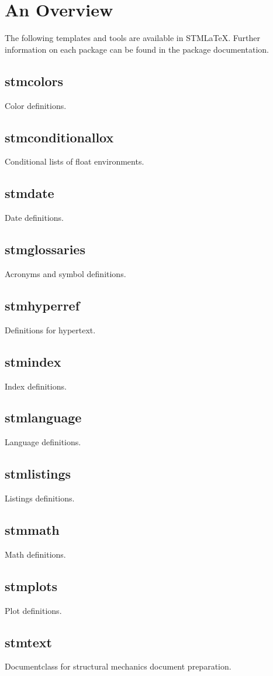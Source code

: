 \documentclass[%
  type=article,%
  layout=koma,%
  page=false,%
  hyperref=true,%
  cleveref=true,%
  conditionallox=true,%
  conditionalloxnewpage=true,%
  date=true,%
  glossaries=true,%
  index=true,%
  math=true,%
  listings=true%
]{stmtext}
\author{Martin R\"{a}del}
\title{\stmlatex}
\subtitle{%
Overview and Installation Guide\\
Copyright \copyright{} \the\year{} DLR SY STM\\v\formatdate[versiondatestyle]{\DTMToday}\\
{\bigskip\small\normalfont Thankfully inspired by the RM-\LaTeX package guide.}
}
\date{\today}
\newcommand{\package}[1]{\subsection*{#1}\par\medskip\noindent\ignorespaces}
\newcommand{\stmlatex}{STM\LaTeX\xspace}
\begin{document}
\maketitle


\begin{abstract}
\stmlatex is a template collection for \LaTeX{} documents. All features and templates are created due to personal interest and are subject to change. All packages are tested using MiKTeX 2.9. However, they are considered as \enquote{as-is} and without any warranty. For questions, suggestion and feedback, please contact the author of the particular package.

\begin{center}
\color{red}
\bfseries
\stmlatex requires an up to date \LaTeX{} installation.
\end{center}
\end{abstract}


\tableofcontents


\section{An Overview}

The following templates and tools are available in \stmlatex. Further information on each package can be found in the package documentation.

\package{stmcolors}
Color definitions.

\package{stmconditionallox}
Conditional lists of float environments.

\package{stmdate}
Date definitions.

\package{stmglossaries}
Acronyms and symbol definitions.

\package{stmhyperref}
Definitions for hypertext.

\package{stmindex}
Index definitions.

\package{stmlanguage}
Language definitions.

\package{stmlistings}
Listings definitions.

\package{stmmath}
Math definitions.

\package{stmplots}
Plot definitions.

\package{stmtext}
Documentclass for structural mechanics document preparation.
\end{document}
